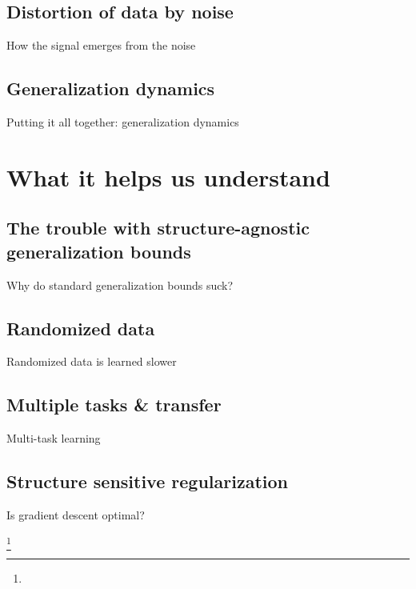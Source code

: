 \documentclass{beamer}
\newcommand\blfootnote[1]{%
  \begingroup
  \renewcommand\thefootnote{}\footnote{#1}%
  \addtocounter{footnote}{-1}%
  \endgroup
}
\begin{document}
\subsection{Distortion of data by noise}
\begin{frame}{How the signal emerges from the noise}

\end{frame}

\subsection{Generalization dynamics}
\begin{frame}{Putting it all together: generalization dynamics}

\end{frame}


\section{What it helps us understand}

\subsection{The trouble with structure-agnostic generalization bounds}
\begin{frame}{Why do standard generalization bounds suck?}
\end{frame}

\subsection{Randomized data}
\begin{frame}{Randomized data is learned slower}
\end{frame}

\subsection{Multiple tasks \& transfer}
\begin{frame}{Multi-task learning}
\end{frame}

\subsection{Structure sensitive regularization}
\begin{frame}{Is gradient descent optimal?}
\end{frame}

\begin{frame}[allowframebreaks]

\blfootnote{}
\end{frame}
\end{document}
